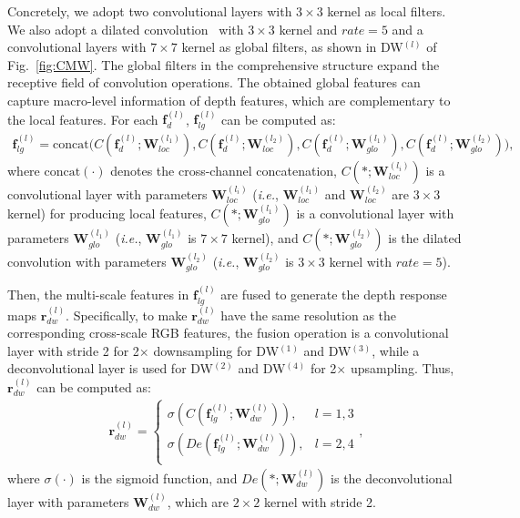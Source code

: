 \documentclass[runningheads]{llncs}
\newcommand{\ie}{\emph{i.e.}}
\begin{document}
Concretely, we adopt two convolutional layers
with $3\!\times\!3$ kernel as local filters.
We also adopt a dilated convolution~\cite{Dila2016} with $3\!\times\!3$ kernel and $rate\!=\!5$
and a convolutional layers with $7\!\times\!7$ kernel
as global filters, as shown in DW$^{(l)}$ of Fig.~\ref{fig:CMW}.
The global filters in the comprehensive structure expand
the receptive field of convolution operations.
The obtained global features can capture macro-level information of depth
features, which are complementary to the local features.
For each $\mathbf{f}^{(l)}_{d}$, $\mathbf{f}^{(l)}_{lg}$ can be computed as:
\begin{equation}
   \begin{aligned}
    \mathbf{f}^{(l)}_{lg} = \mathrm{concat}\big(  C(\mathbf{f}^{(l)}_{d};\mathbf{W}^{(l_1)}_{loc}),C(\mathbf{f}^{(l)}_{d};\mathbf{W}^{(l_2)}_{loc}),
      C(\mathbf{f}^{(l)}_{d};\mathbf{W}^{(l_1)}_{glo}),C(\mathbf{f}^{(l)}_{d};\mathbf{W}^{(l_2)}_{glo}) \big),
    \label{eq:SD-DW}
    \end{aligned}
\end{equation}
where $\mathrm{concat}(\cdot)$ denotes the cross-channel concatenation,
$C(\ast;\mathbf{W}^{(l_i)}_{loc})$ is a convolutional layer with
parameters $\mathbf{W}^{(l_i)}_{loc}$
(\ie, $\mathbf{W}^{(l_1)}_{loc}$ and $\mathbf{W}^{(l_2)}_{loc}$ are $3\!\times\!3$ kernel)
for producing local features,
$C(\ast;\mathbf{W}^{(l_1)}_{glo})$ is a convolutional layer with
parameters $\mathbf{W}^{(l_1)}_{glo}$
(\ie, $\mathbf{W}^{(l_1)}_{glo}$ is $7\!\times\!7$ kernel),
and $C(\ast;\mathbf{W}^{(l_2)}_{glo})$ is the dilated convolution with
parameters $\mathbf{W}^{(l_2)}_{glo}$
(\ie, $\mathbf{W}^{(l_2)}_{glo}$ is $3\!\times\!3$ kernel with $rate\!=\!5$).


Then, the multi-scale features in $\mathbf{f}^{(l)}_{lg}$ are fused to generate
the depth response maps $\mathbf{r}^{(l)}_{dw}$.
Specifically, to make $\mathbf{r}^{(l)}_{dw}$ have the
same resolution as the corresponding cross-scale RGB features,
the fusion operation is a convolutional layer with stride 2 for 2$\times$ downsampling for DW$^{(1)}$ and DW$^{(3)}$,
while a deconvolutional layer is used for DW$^{(2)}$ and DW$^{(4)}$ for 2$\times$ upsampling.
Thus, $\mathbf{r}^{(l)}_{dw}$ can be computed as:
\begin{equation}
   \begin{aligned}
    \mathbf{r}^{(l)}_{dw}=\left\{
	\begin{array}{rcl}
	\sigma(C(\mathbf{f}^{(l)}_{lg};\mathbf{W}^{(l)}_{dw})),      & l=1,3\\
	\sigma(De(\mathbf{f}^{(l)}_{lg};\mathbf{W}^{(l)}_{dw})),      & l=2,4\\
	\end{array} , \right. 
    \label{eq:DRMap}
    \end{aligned}
\end{equation}
where $\sigma(\cdot)$ is the sigmoid function,
and $De(\ast;\mathbf{W}^{(l)}_{dw})$ is the deconvolutional layer with
parameters $\mathbf{W}^{(l)}_{dw}$, which are $2\!\times\!2$ kernel with stride 2.
\end{document}
